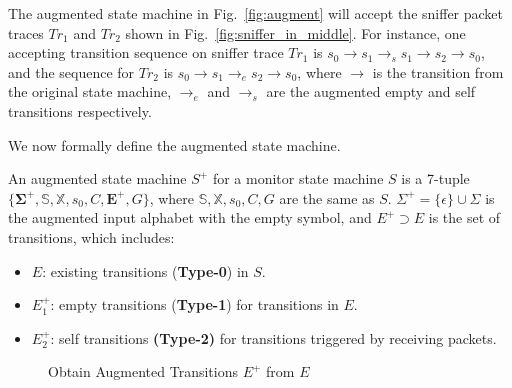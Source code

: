The augmented state machine in Fig.~\ref{fig:augment} will accept the sniffer
packet traces $Tr_1$ and $Tr_2$ shown in Fig.~\ref{fig:sniffer_in_middle}.  For
instance, one accepting transition sequence on sniffer trace $Tr_1$ is
$s_0\rightarrow s_1 \rightarrow_s s_1\rightarrow s_2 \rightarrow s_0$, and the
sequence for $Tr_2$ is $s_0 \rightarrow s_1 \rightarrow_e s_2 \rightarrow s_0$,
where $\rightarrow$ is the transition from the original state machine,
$\rightarrow_e$ and $\rightarrow_s$ are the augmented empty and self transitions
respectively.

We now formally define the augmented state machine.%
\vspace*{-1mm}
\begin{definition}
  An augmented state machine $S^+$ for a monitor state machine $S$ is a 7-tuple
  $\{\boldsymbol{\Sigma^+}, \mathbb{S}, \mathbb{X}, s_0, C, \boldsymbol{E^+},
  G\}$, where $\mathbb{S}, \mathbb{X}, s_0, C, G$ are the same as $S$.
  $\Sigma^+=\{\epsilon\} \cup \Sigma$ is the augmented input alphabet with the
  empty symbol, and $E^+ \supset E$ is the set of transitions, which includes:
  \vspace*{-1mm}
  \begin{itemize}
    \item $E$: existing transitions (\textbf{Type-0}) in $S$.
    \item $E^+_1$: empty transitions (\textbf{Type-1}) for transitions in $E$.
    \item $E^+_2$: self transitions \textbf{(Type-2)} for transitions
      triggered by receiving packets.
  \end{itemize}
\end{definition}

\begin{figure}[t!]
\begin{algorithm}[H]
  \caption{Obtain Augmented Transitions $E^+$ from $E$}
  \label{alg:augment}
  \begin{algorithmic}[1]
      \label{alg:augment:type0}
      \label{alg:augment:type1}
        \label{alg:augment:type2}
      \EndIf
    \EndFor
    \State {}
    \EndFunction
  \end{algorithmic}
\end{algorithm}
\vspace*{-12mm}
\end{figure}

